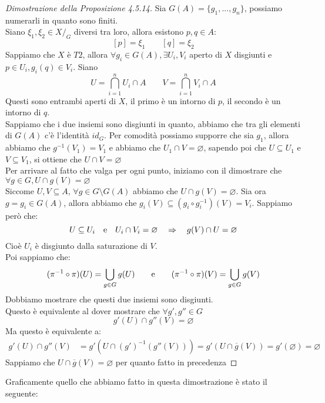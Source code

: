 \documentclass[11pt,a4paper,twoside]{article}
\theoremstyle{definition}
\begin{document}
\begin{proof}[Dimostrazione della Proposizione 4.5.14]
	Sia $G(A) = \{g_1,...,g_n\}$, possiamo numerarli in quanto sono finiti.\\
	Siano $\xi_1, \xi_2 \in X/_G$ diversi tra loro, allora esistono $p,q \in A$:
	\[ [p]=\xi_1\qquad [q]=\xi_2 \]
	Sappiamo che $X$ è $T2$, allora $\forall g_i \in G(A), \exists U_i, V_i$ aperto di $X$ disgiunti e $p \in U_i, g_i(q) \in V_i$. Siano
	\[ U = \bigcap_{i=1}^n U_i \cap A\qquad V = \bigcap_{i = 1}^n V_i \cap A\]
	Questi sono entrambi aperti di $X$, il primo è un intorno di $p$, il secondo è un intorno di $q$.\\
	Sappiamo che i due insiemi sono disgiunti in quanto, abbiamo che tra gli elementi di $G(A)$ c'è l'identità $id_G$. Per comodità possiamo supporre che sia $g_1$, allora abbiamo che $g^{-1}(V_1)=V_1$ e abbiamo che $U_1 \cap V = \varnothing$, sapendo poi che $U \subseteq U_1$ e $V \subseteq V_1$, si ottiene che $U \cap V = \varnothing$\\
	Per arrivare al fatto che valga per ogni punto, iniziamo con il dimostrare che $\forall g \in G, U \cap g(V) = \varnothing$\\
	Siccome $U,V \subseteq A$, $\forall g \in G \setminus G(A)$ abbiamo che $U \cap g(V)= \varnothing$. Sia ora $g = g_i \in G(A)$, allora abbiamo che $g_i(V) \subseteq (g_i\circ g_i^{-1})(V) = V_i$. Sappiamo però che:
	\[ U \subseteq U_i \quad \text e \quad U_i \cap V_i = \varnothing \quad \Rightarrow \quad g(V)\cap U = \varnothing \]
	Cioè $U_i$ è disgiunto dalla saturazione di $V$.\\
	Poi sappiamo che:
	\[ (\pi^{-1}\circ \pi)(U) = \bigcup_{g \in G}g(U)\qquad \text e \qquad (\pi^{-1}\circ \pi)(V) = \bigcup_{g \in G}g(V) \]
	Dobbiamo mostrare che questi due insiemi sono disgiunti.\\
	Questo è equivalente al dover mostrare che $\forall g', g'' \in G$
	\[ g'(U)\cap g''(V) = \varnothing \]
	Ma questo è equivalente a:
	\begin{align*}
		g'(U) \cap g''(V) &= g'(U \cap (g')^{-1}(g''(V))) = g'(U \cap \overline g(V)) = g'(\varnothing) = \varnothing
	\end{align*}
	Sappiamo che $U \cap \overline g(V) = \varnothing$ per quanto fatto in precedenza
\end{proof}

Graficamente quello che abbiamo fatto in questa dimostrazione è stato il seguente:
\end{document}
